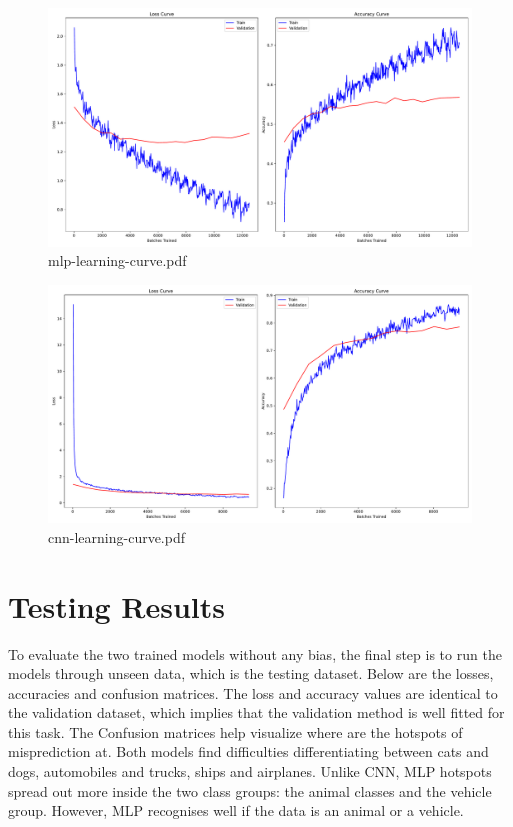 \documentclass{report}
\begin{document}
\begin{figure}[ht]
    \center
    \includegraphics[scale=0.385]{../output/mlp-learning-curve.pdf}
    \caption{mlp-learning-curve.pdf}
\end{figure}

\begin{figure}[ht]
    \center
    \includegraphics[scale=0.385]{../output/cnn-learning-curve.pdf}
    \caption{cnn-learning-curve.pdf}
\end{figure}

\newpage
\section{Testing Results}
To evaluate the two trained models without any bias, the final step is to run the models through unseen data, 
which is the testing dataset. Below are the losses, accuracies and confusion matrices. The loss and accuracy 
values are identical to the validation dataset, which implies that the validation method is well fitted for this task. 
The Confusion matrices help visualize where are the hotspots of misprediction at. Both models find difficulties differentiating 
between cats and dogs, automobiles and trucks, ships and airplanes. Unlike CNN, MLP hotspots spread out more inside the two class 
groups: the animal classes and the vehicle group. However, MLP recognises well if the data is an animal or a vehicle.
\end{document}
